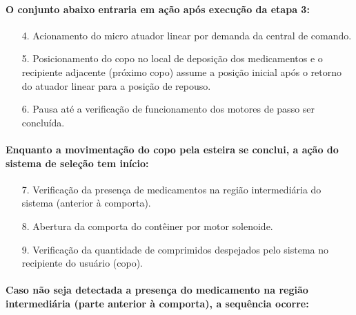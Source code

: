 \paragraph*{O conjunto abaixo entraria em ação após execução da etapa 3:}

\begin{enumerate}
    \item [4.] Acionamento do micro atuador linear por demanda da central de comando.
    \item [5.] Posicionamento do copo no local de deposição dos medicamentos e o recipiente adjacente (próximo copo) assume a posição inicial após o retorno do atuador linear para a posição de repouso.
    \item [6.] Pausa até a verificação de funcionamento dos motores de passo ser concluída.
\end{enumerate}
    
\paragraph*{Enquanto a movimentação do copo pela esteira se conclui, a ação do sistema de seleção tem início:}

\begin{enumerate}
    \item[7.] Verificação da presença de medicamentos na região intermediária do sistema (anterior à comporta).
    \item[8.] Abertura da comporta do contêiner por motor solenoide.
    \item[9.] Verificação da quantidade de comprimidos despejados pelo sistema no recipiente do usuário (copo).
\end{enumerate}
   
\paragraph*{Caso não seja detectada a presença do medicamento na região intermediária (parte  anterior à comporta), a sequência ocorre:}


